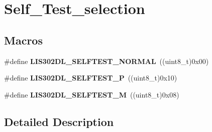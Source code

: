 \hypertarget{group___self___test__selection}{\section{Self\-\_\-\-Test\-\_\-selection}
\label{group___self___test__selection}
}
\subsection*{Macros}
\begin{DoxyCompactItemize}
\item 
\hypertarget{group___self___test__selection_ga081aaef652154f31f2a41521de14a74e}{\#define {\bfseries L\-I\-S302\-D\-L\-\_\-\-S\-E\-L\-F\-T\-E\-S\-T\-\_\-\-N\-O\-R\-M\-A\-L}~((uint8\-\_\-t)0x00)}\label{group___self___test__selection_ga081aaef652154f31f2a41521de14a74e}

\item 
\hypertarget{group___self___test__selection_ga51cf829047ee28747013be34a6c9430f}{\#define {\bfseries L\-I\-S302\-D\-L\-\_\-\-S\-E\-L\-F\-T\-E\-S\-T\-\_\-\-P}~((uint8\-\_\-t)0x10)}\label{group___self___test__selection_ga51cf829047ee28747013be34a6c9430f}

\item 
\hypertarget{group___self___test__selection_ga609eca34586b48759b5edac64c3900a6}{\#define {\bfseries L\-I\-S302\-D\-L\-\_\-\-S\-E\-L\-F\-T\-E\-S\-T\-\_\-\-M}~((uint8\-\_\-t)0x08)}\label{group___self___test__selection_ga609eca34586b48759b5edac64c3900a6}

\end{DoxyCompactItemize}


\subsection{Detailed Description}
